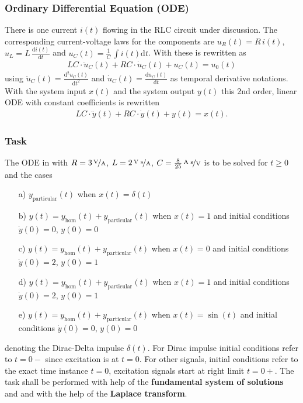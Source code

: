 \subsubsection{Ordinary Differential Equation (ODE)}
There is one current $i(t)$ flowing in the RLC circuit under discussion.
The corresponding current-voltage laws for the components are
$u_R(t) = R\,i(t)$,
$u_L = L\,\frac{\mathrm{d}i(t)}{\mathrm{d} t}$ and
$u_C(t) = \frac{1}{C} \, \int i(t) \mathrm{d}t$.
With these  is rewritten as
%
\begin{align}
L C \cdot \ddot{u}_C(t) + R C \cdot \dot{u}_C(t) + u_C(t) = u_0(t)
\end{align}
using
$\ddot{u}_C(t) = \frac{\mathrm{d}^2 u_C(t)}{\mathrm{d}t^2}$ and
$\dot{u}_C(t) = \frac{\mathrm{d} u_C(t)}{\mathrm{d}t}$
as temporal derivative notations.
%
With
the system input $x(t)$ and
the system output $y(t)$ this 2nd order, linear ODE with
constant coefficients is rewritten
\begin{align}
\label{eq:ODE_RLC}
L C \cdot \ddot{y}(t) + R C \cdot \dot{y}(t) + y(t) = x(t).
\end{align}



\subsubsection{Task}
The ODE in  with
$R = 3\,\nicefrac{\text{V}}{\text{A}}$,
$L=2\,\nicefrac{\text{V s}}{\text{A}}$,
$C=\frac{8}{25}\,\nicefrac{\text{A s}}{\text{V}}$
is to be solved for $t\geq 0$ and the cases
\begin{itemize}
\item[a)] $y_\text{particular}(t)$ when $x(t)=\delta(t)$
\item[b)] $y(t) = y_\text{hom}(t)+y_\text{particular}(t)$ when
$x(t)=1$ and initial conditions $\dot{y}(0) = 0$, $y(0)=0$
\item[c)] $y(t) = y_\text{hom}(t)+y_\text{particular}(t)$ when $x(t)=0$
and initial conditions $\dot{y}(0) = 2$, $y(0)=1$
\item[d)] $y(t) = y_\text{hom}(t)+y_\text{particular}(t)$ when $x(t)=1$
and initial conditions $\dot{y}(0) = 2$, $y(0)=1$
\item[e)] $y(t) = y_\text{hom}(t)+y_\text{particular}(t)$ when $x(t)=\sin(t)$
and initial conditions $\dot{y}(0) = 0$, $y(0)=0$
\end{itemize}
denoting the Dirac-Delta impulse $\delta(t)$.
%
For Dirac impulse initial conditions refer to $t=0-$ since excitation is at $t=0$.
For other signals, initial conditions refer to the exact time instance $t=0$,
excitation signals start at right limit $t=0+$.
%
The task shall be performed with help of the \textbf{fundamental system of solutions}
and and with the help of the \textbf{Laplace transform}.



